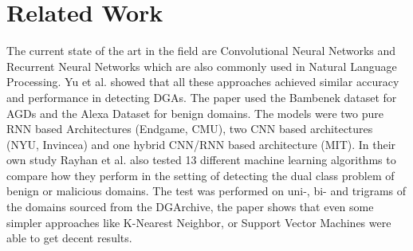 \documentclass[a4paper, 12pt]{article}
\begin{document}
\section{Related Work}
The current state of the art in the field are Convolutional Neural Networks and Recurrent Neural
Networks which are also commonly used in Natural Language Processing. Yu et al.
\cite{yu_character_2018} showed that all these approaches achieved similar accuracy and performance
in detecting DGAs.  The paper used the Bambenek dataset for AGDs and the Alexa Dataset for benign
domains. The models were two pure RNN based Architectures (Endgame, CMU), two CNN based
architectures (NYU, Invincea) and one hybrid CNN/RNN based architecture (MIT). 
In their own study Rayhan et al. \cite{rayhan_experimental_2020} also tested 13 different
machine learning algorithms to compare how they perform in the setting of detecting the dual class
problem of benign or malicious domains. The test was performed on uni-, bi- and trigrams of the
domains sourced from the DGArchive, the paper shows that even some simpler approaches like K-Nearest
Neighbor, or Support Vector Machines were able to get decent results.

\clearpage

\printbibliography
\end{document}
